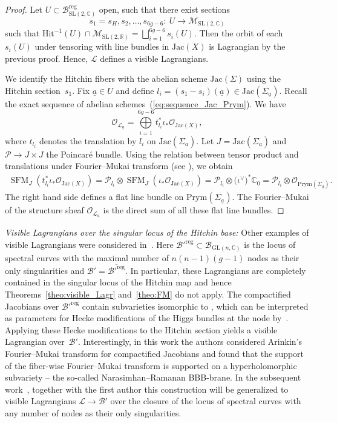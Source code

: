 \documentclass[10pt,a4paper]{amsart}
\numberwithin{equation}{section}
\theoremstyle{definition}
\newcommand{\reg}{\mathrm{reg}}
\newcommand{\Jac}{\mathrm{Jac}}
\renewcommand{\to}{\rightarrow}
\newcommand{\calB}{\mathcal{B}}
\newcommand{\calL}{\mathcal{L}}
\newcommand{\calM}{\mathcal{M}}
\newcommand{\calO}{\mathcal{O}}
\newcommand{\calP}{\mathcal{P}}
\newcommand{\RR}{\mathbb{R}}
\newcommand{\CC}{\mathbb{C}}
\newcommand{\PP}{\mathbb{P}}
\DeclareMathOperator{\SFM}{SFM}
\newcommand{\Prym}{\mathrm{Prym}}
\newcommand{\Hit}{\mathrm{Hit}}
\newcommand{\GL}{\mathrm{GL}}
\newcommand{\SL}{\mathrm{SL}}
\begin{document}
\begin{proof}
 Let $U \subset \calB^{\reg}_{\SL(2,\CC)}$ open, such that there exist sections
 \[ s_1=s_H, s_2, \dots, s_{6g-6}\colon \ U \to \calM_{\SL(2,\CC)}
 \]
 such that $\Hit^{-1}(U) \cap \calM_{\SL(2,\RR)} = \bigsqcup_{i=1}^{6g-6} s_i(U)$. Then the orbit of each $s_i(U)$ under tensoring with line bundles in $\Jac(X)$ is Lagrangian by the previous proof. Hence, $\calL$ defines a visible Lagrangians.

 We identify the Hitchin fibers with the abelian scheme $\Jac(\Sigma)$ using the Hitchin section~$s_1$. Fix $\underline{a} \in U$ and define $l_i = (s_1-s_i)(\underline{a}) \in \Jac(\Sigma_{\underline{a}})$. Recall the exact sequence of abelian schemes~(\ref{eq:sequence_Jac_Prym}). We have
 \[ \calO_{\calL_{\underline{a}}} = \bigoplus\limits_{i=1}^{6g-6} t^*_{l_i} \iota_* \calO_{\Jac(X)},
 \] where $t_{l_i}$ denotes the translation by $l_i$ on $\Jac(\Sigma_{\underline{a}})$. Let $J=\Jac(\Sigma_{\underline{a}})$ and $\calP \to J \times J$ the Poincar\'e bundle. Using the relation between tensor product and translations under Fourier--Mukai transform (see \cite{Schnell}), we obtain
 \begin{align*} \SFM_{J}(t^*_{l_i} \iota_*\calO_{\Jac(X)}) = \calP_{l_i} \otimes \SFM_{J}(\iota_* \calO_{\Jac(X)})= \calP_{l_i} \otimes \bigl(\iota^\vee\bigr)^* \CC_0 = \calP_{l_i} \otimes \calO_{\Prym(\Sigma_{\underline{a}})}.
 \end{align*}
 The right hand side defines a flat line bundle on $\Prym(\Sigma_{\underline{a}})$. The Fourier--Mukai of the structure sheaf $\calO_{\calL_{\underline{a}}}$ is the direct sum of all these flat line bundles.
\end{proof}


\textit{Visible Lagrangians over the singular locus of the Hitchin base:}
Other examples of visible Lagrangians were considered in~\cite{FGOP}. Here $\calB'^\reg \subset \calB_{\GL(n,\CC)}$ is the locus of spectral curves with the maximal number of $n(n-1)(g-1)$ nodes as their only singularities and $\calB'=\overline{\calB'^\reg}$. In particular, these Lagrangians are completely contained in the singular locus of the Hitchin map and hence Theorems~\ref{theo:visible_Lagr} and~\ref{theo:FM} do not apply. The compactified Jacobians over $\calB'^\reg$ contain subvarieties isomorphic to \smash{$\bigl(\PP^1\bigr)^{n(n-1)(g-1)}$}, which can be interpreted as parameters for Hecke modifications of the Higgs bundles at the node by~\cite{Horn1}. Applying these Hecke modifications to the Hitchin section yields a visible Lagrangian over~$\calB'$. Interestingly, in this work the authors considered Arinkin's Fourier--Mukai transform for compactified Jacobians and found that the support of the fiber-wise Fourier--Mukai transform is supported on a hyperholomorphic subvariety -- the so-called Narasimhan--Ramanan BBB-brane. In the subsequent work~\cite{FHHO}, together with the first author this construction will be generalized to visible Lagrangians $\calL \to \calB'$ over the closure of the locus of spectral curves with any number of nodes as their only singularities.
\end{document}

